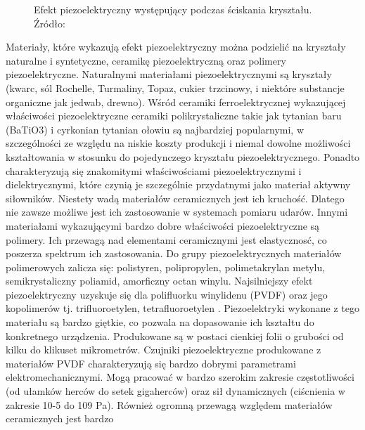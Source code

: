 \begin{figure}[htbp]
\centering
{}
\caption{Efekt piezoelektryczny występujący podczas ściskania kryształu. Źródło: \cite{To_Do}}
\label{fig:piezo_effect}
\end{figure}
Materiały, które wykazują efekt piezoelektryczny można podzielić na kryształy naturalne 
i syntetyczne, ceramikę piezoelektryczną oraz polimery piezoelektryczne. Naturalnymi 
materiałami piezoelektrycznymi są kryształy (kwarc, sól Rochelle, Turmaliny, Topaz, 
cukier trzcinowy, i niektóre substancje organiczne jak jedwab, drewno). Wśród ceramiki 
ferroelektrycznej wykazującej właściwości piezoelektryczne ceramiki polikrystaliczne 
takie jak tytanian baru (BaTiO3) i cyrkonian tytanian ołowiu są najbardziej popularnymi, 
w szczególności ze względu na niskie koszty produkcji i niemal dowolne możliwości 
kształtowania w stosunku do pojedynczego kryształu piezoelektrycznego. Ponadto 
charakteryzują się znakomitymi właściwościami piezoelektrycznymi i dielektrycznymi, 
które czynią je szczególnie przydatnymi jako materiał aktywny siłowników. Niestety wadą 
materiałów ceramicznych jest ich kruchość. Dlatego nie zawsze możliwe jest ich 
zastosowanie w systemach pomiaru udarów. Innymi materiałami wykazującymi bardzo dobre 
właściwości piezoelektryczne są polimery. Ich przewagą nad elementami ceramicznymi jest 
elastycznosć, co poszerza spektrum ich zastosowania. Do grupy piezoelektrycznych 
materiałów polimerowych zalicza się: polistyren, polipropylen, polimetakrylan metylu, 
semikrystaliczny poliamid, amorficzny octan winylu. Najsilniejszy efekt piezoelektryczny 
uzyskuje się dla polifluorku winylidenu (PVDF) oraz jego kopolimerów tj. trifluoroetylen,
tetrafluoroetylen \cite{To_Do}
. Piezoelektryki wykonane z tego materiału są bardzo giętkie, co 
pozwala na dopasowanie ich kształtu do konkretnego urządzenia. Produkowane są w postaci 
cienkiej folii o grubości od kilku do klikuset mikrometrów. Czujniki piezoelektryczne 
produkowane z materiałów PVDF charakteryzują się bardzo dobrymi parametrami 
elektromechanicznymi. Mogą pracować w bardzo szerokim zakresie częstotliwości 
(od ułamków herców do setek gigaherców) oraz sił dynamicznych (ciścnienia w zakresie 
10-5 do 109 Pa). Również ogromną przewagą względem materiałów ceramicznych jest bardzo 
